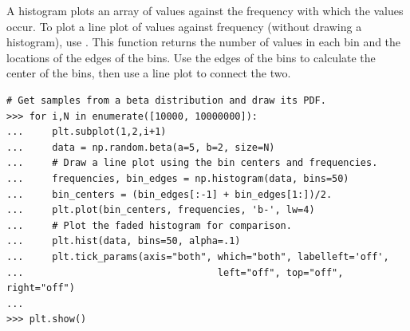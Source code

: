 A histogram plots an array of values against the frequency with which the values occur.
To plot a line plot of values against frequency (without drawing a histogram), use .
This function returns the number of values in each bin and the locations of the edges of the bins.
Use the edges of the bins to calculate the center of the bins, then use a line plot to connect the two.

\begin{lstlisting}
# Get samples from a beta distribution and draw its PDF.
>>> for i,N in enumerate([10000, 10000000]):
...     plt.subplot(1,2,i+1)
...     data = np.random.beta(a=5, b=2, size=N)
...     # Draw a line plot using the bin centers and frequencies.
...     frequencies, bin_edges = np.histogram(data, bins=50)
...     bin_centers = (bin_edges[:-1] + bin_edges[1:])/2.
...     plt.plot(bin_centers, frequencies, 'b-', lw=4)
...     # Plot the faded histogram for comparison.
...     plt.hist(data, bins=50, alpha=.1)
...     plt.tick_params(axis="both", which="both", labelleft='off',
...                                  left="off", top="off", right="off")
...
>>> plt.show()
\end{lstlisting}

